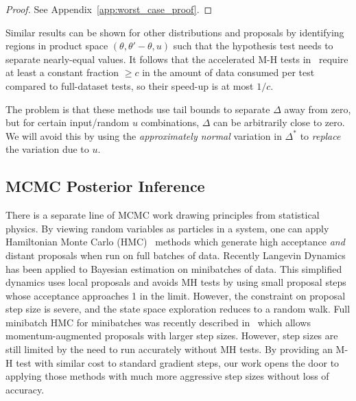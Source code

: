 \documentclass{article}
\begin{document}
\begin{proof}
See Appendix~\ref{app:worst_case_proof}.
\end{proof}

Similar results can be shown for other distributions and proposals by
identifying regions in product space $(\theta,\theta'-\theta,u)$ such that the
hypothesis test needs to separate nearly-equal values.  It follows that the
accelerated M-H tests in~\cite{cutting_mh_2014,icml2014c1_bardenet14} require at
least a constant fraction $\geq c$ in the amount of data consumed per test
compared to full-dataset tests, so their speed-up is at most $1/c$.


The problem is that these methods use tail bounds to separate $\Delta$ away
from zero, but for certain input/random $u$ combinations, $\Delta$ can be
arbitrarily close to zero. We will avoid this by using the {\em approximately
normal} variation in $\Delta^*$ to {\em replace} the variation due to $u$. 

\subsection{MCMC Posterior Inference}
There is a separate line of MCMC work drawing principles from statistical
physics. By viewing random variables as particles in a system, one can apply
Hamiltonian Monte Carlo (HMC)~\cite{mcmc_hamiltonian_2010} methods which
generate high acceptance \emph{and} distant proposals when run on full batches
of data. Recently Langevin Dynamics~\cite{langevin_2011,conf/icml/AhnBW12} has
been applied to Bayesian estimation on minibatches of data. This simplified
dynamics uses local proposals and avoids MH tests by using small proposal steps
whose acceptance approaches 1 in the limit. However, the constraint on proposal
step size is severe, and the state space exploration reduces to a random walk.
Full minibatch HMC for minibatches was recently described in~\cite{sghmc_2014}
which allows momentum-augmented proposals with larger step sizes. However, step
sizes are still limited by the need to run accurately without MH tests.  By providing
an M-H test with similar cost to standard gradient steps, our
work opens the door to applying those methods with much more aggressive step
sizes without loss of accuracy. 
\end{document}

